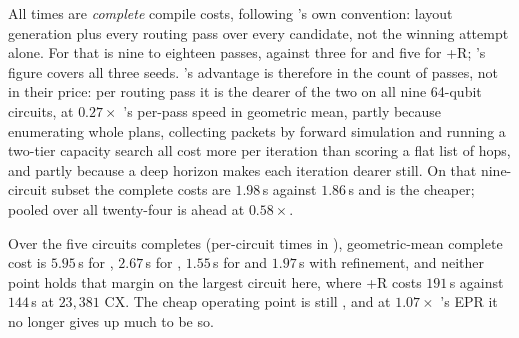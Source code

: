 All times are \emph{complete} compile costs, following \dSABRE{}'s own
convention: layout generation plus every routing pass over every
candidate, not the winning attempt alone. For \dSABRE{} that is nine to
eighteen passes, against three for \PORTER{} and five for \PORTER{}+R;
\TeleSABRE{}'s figure covers all three seeds. \PORTER{}'s advantage is
therefore in the count of passes, not in their price: per routing pass
it is the dearer of the two on all nine 64-qubit circuits, at $0.27\times$
\dSABRE{}'s per-pass speed in geometric mean, partly because enumerating
whole plans, collecting packets by forward simulation and running a
two-tier capacity search all cost more per iteration than scoring a flat
list of hops, and partly because a deep horizon makes each iteration
dearer still. On that nine-circuit subset the complete costs are
$1.98$\,s against $1.86$\,s and \dSABRE{} is the cheaper; pooled over
all twenty-four \PORTER{} is ahead at $0.58\times$.

Over the five circuits \TeleSABRE{} completes (per-circuit times in
\appTables{}), geometric-mean complete cost is $5.95$\,s for
\TeleSABRE{}, $2.67$\,s for \dSABRE{}, $1.55$\,s for \PORTER{} and
$1.97$\,s with refinement, and neither \PORTER{} point holds that margin
on the largest circuit here, where \PORTER{}+R costs $191$\,s against
$144$\,s at $23{,}381$ CX. The cheap operating point is still
\PORTER{}, and at $1.07\times$ \dSABRE{}'s EPR it no longer gives up
much to be so.
